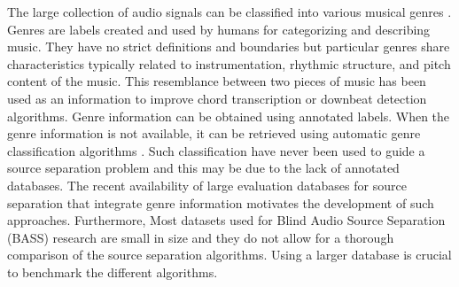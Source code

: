 \documentclass{article}
\begin{document}
The large collection of audio signals can be classified into various musical genres \cite{tzanetakis2002musical}. Genres are labels created and used by humans for categorizing and describing music. They have no strict definitions and boundaries but particular genres share characteristics typically related to instrumentation, rhythmic structure, and pitch content of the music. This resemblance between two pieces of music has been used as an information to improve chord transcription \cite{ni2012using,lee2008acoustic} or downbeat detection \cite{hockman2012one} algorithms. Genre information can be obtained using annotated labels. When the genre information is not available, it can be retrieved using automatic genre classification algorithms \cite{tzanetakis2002musical,mckay2006musical}. Such classification have never been used to guide a source separation problem and this may be due to the lack of annotated databases. The recent availability of large evaluation databases for source separation that integrate genre information motivates the development of such approaches. Furthermore, Most datasets used for Blind Audio Source Separation (BASS) research are small in size and they do not allow for a thorough comparison of the source separation algorithms. Using a larger database is crucial to benchmark the different algorithms.
\end{document}
